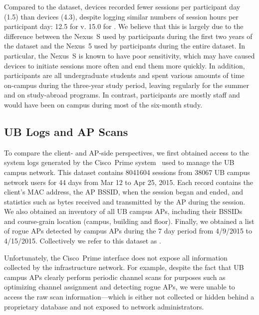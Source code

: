 Compared to the \ubscan{} dataset, \NetSense{} devices recorded fewer
sessions per participant day (1.5) than \PhoneLab{} devices (4.3), despite
logging similar numbers of session hours per participant day: 12.5 for
\ndscan{} v. 15.0 for \ubscan{}. We believe that this is largely due to the
difference between the Nexus~S used by \NetSense{} participants during the
first two years of the \ndscan{} dataset and the Nexus~5 used by \PhoneLab{}
participants during the entire \ubscan{} dataset. In particular, the Nexus~S
is known to have poor \wifi{} sensitivity, which may have caused \NetSense{}
devices to initiate sessions more often and end them more quickly. In
addition, \NetSense{} participants are all undergraduate students and spent
various amounts of time on-campus during the three-year study period, leaving
regularly for the summer and on study-abroad programs. In contrast,
\PhoneLab{} participants are mostly staff and would have been on campus
during most of the six-month study.

\subsection{UB \wifi{} Logs and AP Scans}
\label{subsec:cit}

To compare the client- and AP-side perspectives, we first obtained access to the
system logs generated by the Cisco~Prime system~\cite{ciscoprime} used to manage
the UB campus \wifi{} network. This dataset contains \num{8041604} \wifi{}
sessions from \num{38067} UB campus network users for 44 days from Mar 12 to Apr
25, 2015. Each record contains the client's MAC address, the AP BSSID, when the
\wifi{} session began and ended, and statistics such as bytes received and
transmitted by the AP during the session. We also obtained an inventory of all
UB campus APs, including their BSSIDs and course-grain location (campus,
building and floor). Finally, we obtained a list of rogue APs detected by campus
APs during the 7 day period from 4/9/2015 to 4/15/2015. Collectively we refer to
this dataset as \textbf{\ubap{}}.

Unfortunately, the Cisco~Prime interface does not expose all information
collected by the infrastructure network. For example, despite the fact that
UB campus APs clearly perform periodic channel scans for purposes such as
optimizing channel assignment and detecting rogue APs, we were unable to
access the raw scan information---which is either not collected or hidden
behind a proprietary database and not exposed to network administrators.

